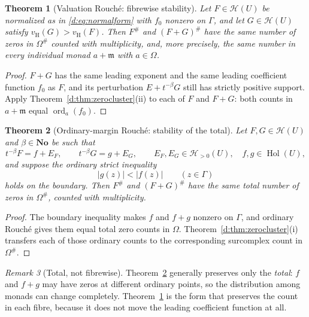 \documentclass[11pt,a4paper]{article}
\numberwithin{equation}{section}
\newtheorem{theorem}{Theorem}[section]
\theoremstyle{definition}
\theoremstyle{remark}
\newtheorem{remark}[theorem]{Remark}
\theoremstyle{plain}
\newcommand{\No}{\mathbf{No}}
\newcommand{\mm}{\mathfrak m}
\DeclareMathOperator{\Hol}{Hol}
\DeclareMathOperator{\ord}{ord}
\newcommand{\tm}{t}
\newcommand{\halo}[1]{#1^{\#}}
\newcommand{\ev}[1]{#1^{\#}}
\newcommand{\Hc}{\mathcal H}
\newcommand{\vH}{v_{\mathrm H}}
\newcommand{\abs}[1]{\lvert #1\rvert}
\begin{document}
\begin{theorem}[Valuation Rouch\'e: fibrewise stability]
\label{d:thm:rouchevaluation}
Let $F\in\Hc(U)$ be normalized as in \eqref{d:eq:normalform} with $f_0$
nonzero on $\Gamma$, and let $G\in\Hc(U)$ satisfy $\vH(G)>\vH(F)$.
Then $\ev F$ and $\ev{(F+G)}$ have the same number of zeros in
$\halo\Omega$ counted with multiplicity, and, more precisely, the same
number in \emph{every individual monad} $a+\mm$ with $a\in\Omega$.
\end{theorem}

\begin{proof}
$F+G$ has the same leading exponent and the same leading coefficient
function $f_0$ as $F$, and its perturbation
$E+\tm^{-\beta}G$ still has strictly positive support.  Apply
Theorem~\ref{d:thm:zerocluster}(ii) to each of $F$ and $F+G$: both
counts in $a+\mm$ equal $\ord_a(f_0)$.
\end{proof}

\begin{theorem}[Ordinary-margin Rouch\'e: stability of the total]
\label{d:thm:rouchemargin}
Let $F,G\in\Hc(U)$ and $\beta\in\No$ be such that
\[
 \tm^{-\beta}F=f+E_F,\qquad \tm^{-\beta}G=g+E_G,
 \qquad E_F,E_G\in\Hc_{>0}(U),\quad f,g\in\Hol(U),
\]
and suppose the \emph{ordinary} strict inequality
\[
 \abs{g(z)}<\abs{f(z)}\qquad(z\in\Gamma)
\]
holds on the boundary.  Then $\ev F$ and $\ev{(F+G)}$ have the same
total number of zeros in $\halo\Omega$, counted with multiplicity.
\end{theorem}

\begin{proof}
The boundary inequality makes $f$ and $f+g$ nonzero on $\Gamma$, and
ordinary Rouch\'e gives them equal total zero counts in $\Omega$.
Theorem~\ref{d:thm:zerocluster}(i) transfers each of those ordinary
counts to the corresponding surcomplex count in $\halo\Omega$.
\end{proof}

\begin{remark}[Total, not fibrewise]
\label{d:rem:totalonly}
Theorem~\ref{d:thm:rouchemargin} generally preserves only the
\emph{total}: $f$ and $f+g$ may have zeros at different ordinary
points, so the distribution among monads can change completely.
Theorem~\ref{d:thm:rouchevaluation} is the form that preserves the
count in each fibre, because it does not move the leading coefficient
function at all.
\end{remark}
\end{document}
